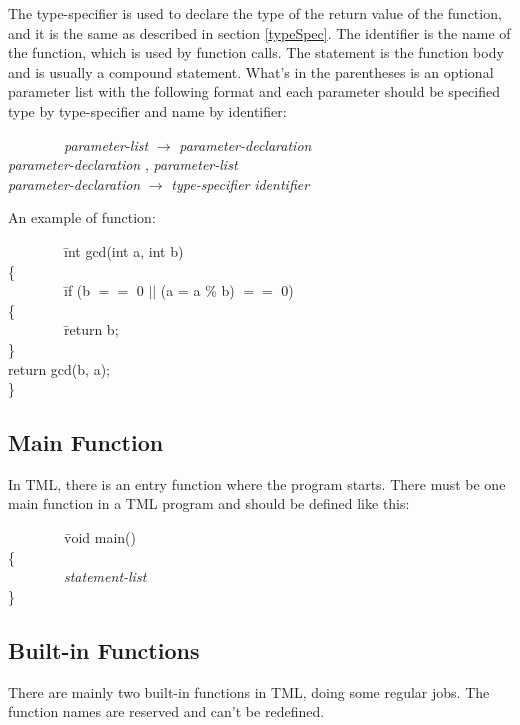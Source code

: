 \documentclass[12pt,psfig,a4]{article}
\begin{document}
The type-specifier is used to declare the type of the return value of the function, and it is the same as described in section \ref{typeSpec}. The identifier is the name of the function, which is used by function calls. The statement is the function body and is usually a compound statement. What's in the parentheses is an optional parameter list with the following format and each parameter should be specified type by type-specifier and name by identifier:
\begin{code}
\begin{tabbing}
~~~~~~~~\= \textsl{parameter-list} $\rightarrow$ \= \textsl{parameter-declaration} \\
\> \> \textsl{parameter-declaration} , \textsl{parameter-list} \\
\> \textsl{parameter-declaration} $\rightarrow$ \textsl{type-specifier} \textsl{identifier}
\end{tabbing}
\end{code}

An example of function:
\begin{code}
\begin{tabbing}
~~~~~~~~\= int gcd(int a, int b) \\
\> \{ \\
\> ~~~~~~~~\= if (b $==$ 0 $||$ (a = a \% b) $==$ 0) \\
\> \> \{ \\
\> \> ~~~~~~~~\= return b; \\
\> \> \} \\
\> \> return gcd(b, a); \\
\> \}
\end{tabbing}
\end{code}

\subsection{Main Function}
In TML, there is an entry function where the program starts. There must be one main function in a TML program and should be defined like this:
\begin{code}
\begin{tabbing}
~~~~~~~~\= void main() \\
\> \{ \\
\> ~~~~~~~~\textsl{statement-list} \\
\> \} 
\end{tabbing}
\end{code}

\subsection{Built-in Functions}
There are mainly two built-in functions in TML, doing some regular jobs. The function names are reserved and can't be redefined.
\end{document}
